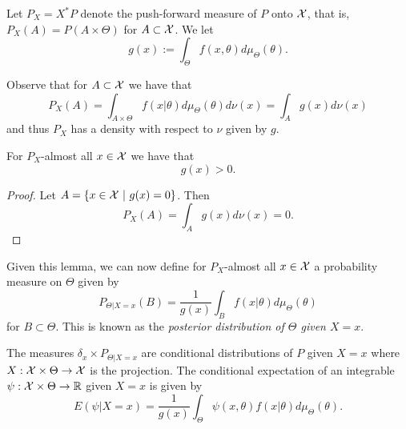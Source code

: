 \documentclass[twoside, a4paper, 10pt]{amsart}
\begin{document}
Let $P_X=X^*P$ denote the push-forward measure of $P$ onto $\mathcal{X}$, that is, $P_X(A) = P(A \times \Theta)$ for $A \subset \mathcal{X}$. We let $$g(x) := \int_{\Theta} f(x,\theta) d\mu_{\Theta}(\theta).$$

Observe that for $A \subset \mathcal{X}$ we have that $$P_X(A) = \int_{A \times \Theta} f(x|\theta) d\mu_{\Theta}(\theta) d\nu(x) = \int_{A} g(x) d\nu(x)$$ and thus $P_X$ has a density with respect to $\nu$ given by $g$.
\begin{lemma}\label{lemma: denom non-zero almost surely} For $P_X$-almost all $x \in \mathcal{X} $ we have that $$g(x)  > 0.$$

\end{lemma}

\begin{proof} Let $A = \{x \in \mathcal{X} ~|~ g(x) = 0 \}$. Then $$P_X(A) = \int_{A} g(x) d\nu(x) = 0.  $$

\end{proof}

Given this lemma, we can now define for $P_X$-almost all $x \in \mathcal{X}$ a probability measure on $\Theta$ given by $$P_{\Theta|X=x}(B) = \frac{1}{g(x)} \int_{B} f(x|\theta) d\mu_{\Theta}(\theta)$$ for $B \subset \Theta$. This is known as the \textit{posterior distribution of $\Theta$ given $X = x$}.

\begin{prop} The measures $\delta_x \times P_{\Theta |X=x}$ are conditional distributions of $P$ given $X=x$ where $X:\mathcal{X} \times \Theta \to \mathcal{X}$ is the projection. The conditional expectation of an integrable $\psi:\mathcal{X} \times \Theta \to \mathbb{R}$ given $X=x$ is given by $$E(\psi | X=x) = \frac{1}{g(x)}\int_{\Theta} \psi(x,\theta) f(x|\theta) d\mu_{\Theta}(\theta).$$ 

\end{prop}
\end{document}
